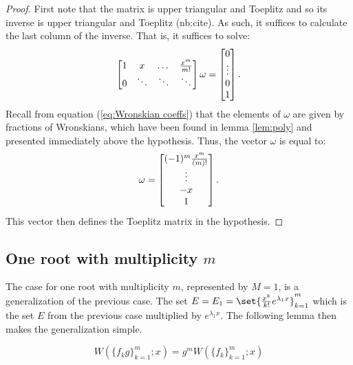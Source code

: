 \documentclass{article}
\begin{document}
\begin{proof}
First note that the matrix is upper triangular and Toeplitz and so its inverse is upper triangular and Toeplitz (nb:cite).
As such, it suffices to calculate the last column of the inverse.
That is, it suffices to solve:
\begin{equation*}
\begin{bmatrix} 1 & x & \dots & \frac{x^m}{m!} \\ 0 & \ddots & \ddots & \ddots \end{bmatrix} \omega = \begin{bmatrix} 0 \\ \vdots \\ 0 \\ 1 \end{bmatrix} .
\end{equation*}
Recall from equation (\ref{eq:Wronskian coeffs}) that the elements of $\omega$ are given by fractions of Wronskians, which have been found in lemma \ref{lem:poly} and presented immediately above the hypothesis.
Thus, the vector $\omega$ is equal to:
\begin{equation*}
\omega = \begin{bmatrix} (-1)^m \frac{x^{m}}{(m)!} \\ \vdots \\ -x \\ 1 \end{bmatrix} .
\end{equation*}
This vector then defines the Toeplitz matrix in the hypothesis.
\end{proof}

\subsection{One root with multiplicity $m$}

The case for one root with multiplicity $m$, represented by $M=1$, is a generalization of the previous case.
The set $E = E_1 = \set{\Poly{k} e^{\lambda_1 x}}_{k=1}^m$ which is the set $E$ from the previous case multiplied by $e^{\lambda_1 x}$.
The following lemma then makes the generalization simple.

\begin{lemma}
\begin{equation*}
W(\{ f_k g \}_{k=1}^m ; x) = g^m W(\{ f_k \}_{k=1}^m ; x )
\end{equation*}
\label{lem:group}
\end{lemma}
\end{document}
